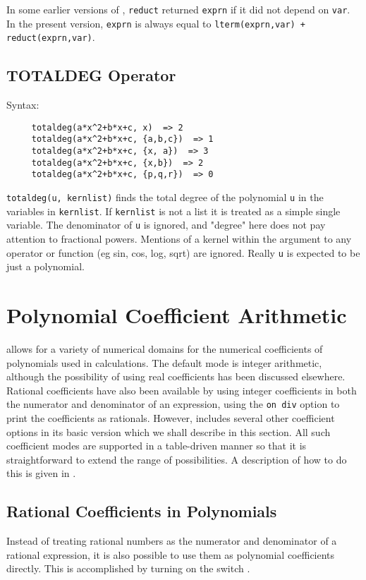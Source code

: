 {\COMPATNOTE} In some earlier versions of \REDUCE, \texttt{reduct} returned
\texttt{exprn} if it did not depend on \texttt{var}.  In the present version,
\texttt{exprn} is always equal to \texttt{lterm(exprn,var) + reduct(exprn,var)}.

\subsection{TOTALDEG Operator}
\hypertarget{operator:TOTALDEG}{}

Syntax:
\begin{verbatim}
     totaldeg(a*x^2+b*x+c, x)  => 2
     totaldeg(a*x^2+b*x+c, {a,b,c})  => 1
     totaldeg(a*x^2+b*x+c, {x, a})  => 3
     totaldeg(a*x^2+b*x+c, {x,b})  => 2
     totaldeg(a*x^2+b*x+c, {p,q,r})  => 0
\end{verbatim}
\texttt{totaldeg(u, kernlist)} finds the total degree of the polynomial \texttt{u} in
the variables in \texttt{kernlist}. If \texttt{kernlist} is not a list it is treated
as a simple single variable.
The denominator of \texttt{u} is ignored, and "degree" here does not pay attention
to fractional powers. Mentions of a kernel within the argument to any
operator or function (eg sin, cos, log, sqrt) are ignored. Really \texttt{u} is
expected to be just a polynomial.

\section{Polynomial Coefficient Arithmetic}
{\REDUCE} allows for a variety of numerical domains for the numerical
coefficients of polynomials used in calculations.  The default mode is
integer arithmetic, although the possibility of using real coefficients
 has been discussed elsewhere.  Rational
coefficients have also been available by using integer coefficients in
both the numerator and denominator of an expression, using the 
\texttt{on div} option to print the coefficients as rationals.
However, {\REDUCE} includes several other coefficient options in its basic
version which we shall describe in this section.  All such coefficient
modes are supported in a table-driven manner so that it is
straightforward to extend the range of possibilities.  A description of
how to do this is given in \cite{Bradford:86}.

\subsection{Rational Coefficients in Polynomials}
\hypertarget{switch:RATIONAL}{}
Instead of treating rational numbers as the numerator and denominator of a
rational expression, it is also possible to use them as polynomial
coefficients directly. This is accomplished by turning on the switch
.

